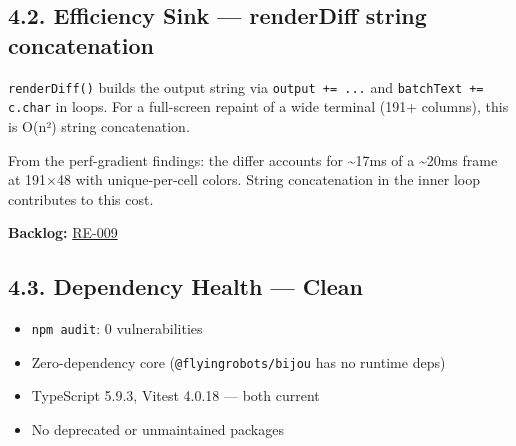 \subsection{4.2. Efficiency Sink --- renderDiff string concatenation}\label{record-411-efficiency-sink-renderdiff-string-concatenation}

\texttt{r\allowbreak{}e\allowbreak{}n\allowbreak{}d\allowbreak{}e\allowbreak{}r\allowbreak{}D\allowbreak{}i\allowbreak{}f\allowbreak{}f\allowbreak{}(\allowbreak{})} builds the output string via \texttt{o\allowbreak{}u\allowbreak{}t\allowbreak{}p\allowbreak{}u\allowbreak{}t\allowbreak{} \allowbreak{}+\allowbreak{}=\allowbreak{} \allowbreak{}.\allowbreak{}.\allowbreak{}.} and \texttt{b\allowbreak{}a\allowbreak{}t\allowbreak{}c\allowbreak{}h\allowbreak{}T\allowbreak{}e\allowbreak{}x\allowbreak{}t\allowbreak{} \allowbreak{}+\allowbreak{}=\allowbreak{} \allowbreak{}c\allowbreak{}.\allowbreak{}c\allowbreak{}h\allowbreak{}a\allowbreak{}r} in loops. For a full-screen repaint of a wide terminal (191+ columns), this is O(n²) string concatenation.

From the perf-gradient findings: the differ accounts for \textasciitilde17ms of a \textasciitilde20ms frame at 191×48 with unique-per-cell colors. String concatenation in the inner loop contributes to this cost.

\textbf{Backlog:} \href{https://github.com/flyingrobots/bijou/blob/cbd70612140e7a450d764b3c7be1c6af878b99bc/docs/method/graveyard/legacy-backlog/bad-code/RE-009-differ-string-concatenation.md}{RE-009}

\subsection{4.3. Dependency Health --- Clean}\label{record-411-dependency-health-clean}

\begin{itemize}
\tightlist
\item
  \texttt{n\allowbreak{}p\allowbreak{}m\allowbreak{} \allowbreak{}a\allowbreak{}u\allowbreak{}d\allowbreak{}i\allowbreak{}t}: 0 vulnerabilities
\item
  Zero-dependency core (\texttt{@\allowbreak{}f\allowbreak{}l\allowbreak{}y\allowbreak{}i\allowbreak{}n\allowbreak{}g\allowbreak{}r\allowbreak{}o\allowbreak{}b\allowbreak{}o\allowbreak{}t\allowbreak{}s\allowbreak{}/\allowbreak{}b\allowbreak{}i\allowbreak{}j\allowbreak{}o\allowbreak{}u} has no runtime deps)
\item
  TypeScript 5.9.3, Vitest 4.0.18 --- both current
\item
  No deprecated or unmaintained packages
\end{itemize}

